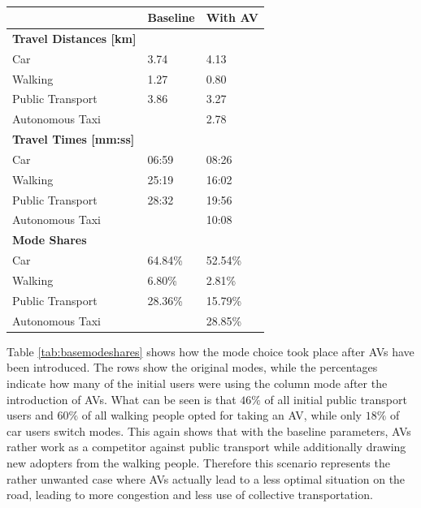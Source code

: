 \begin{table}[]
\centering
\caption{}
\label{tab:withwithoutav}
\begin{tabular}{@{}lll@{}}
\toprule
                                   & \textbf{Baseline} & \textbf{With AV} \\ \midrule
\textbf{Travel Distances {[}km{]}} &                   &                  \\
Car                                & 3.74              & 4.13             \\
Walking                            & 1.27              & 0.80             \\
Public Transport                   & 3.86              & 3.27             \\
Autonomous Taxi                    &                   & 2.78             \\
\textbf{Travel Times {[}mm:ss{]}}  &                   &                  \\
Car                                & 06:59             & 08:26            \\
Walking                            & 25:19             & 16:02            \\
Public Transport                   & 28:32             & 19:56            \\
Autonomous Taxi                    &                   & 10:08            \\
\textbf{Mode Shares}               &                   &                  \\
Car                                & 64.84\%           & 52.54\%          \\
Walking                            & 6.80\%            & 2.81\%           \\
Public Transport                   & 28.36\%           & 15.79\%          \\
Autonomous Taxi                    &                   & 28.85\%          \\ \bottomrule
\end{tabular}
\end{table}


Table \cref{tab:basemodeshares} shows how the mode choice took place after AVs
have been introduced. The rows show the original modes, while the percentages
indicate how many of the initial users were using the column mode after the
introduction of AVs. What can be seen is that $46\%$ of all initial public transport
users and $60\%$ of all walking people opted for taking an AV, while only $18\%$
of car users switch modes. This again shows that with the baseline parameters, AVs rather
work as a competitor against public transport while additionally drawing new adopters
from the walking people. Therefore this scenario represents the rather unwanted case
where AVs actually lead to a less optimal situation on the road, leading to more
congestion and less use of collective transportation.

